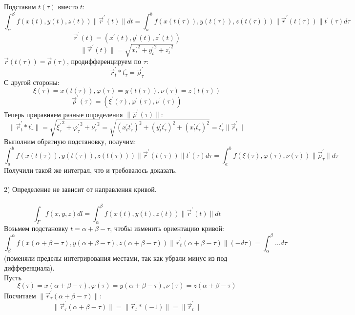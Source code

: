 \documentclass[12pt]{article}
\begin{document}
Подставим $t(\tau)$ вместо $t$:\\
$$\int_\alpha^\beta f(x(t), y(t), z(t)) \| \overrightarrow{r}^{'}(t)\|dt = \int_a^b f(x(t(\tau)), y(t(\tau)), z(t(\tau))) \| \overrightarrow{r}^{'}(t(\tau))\|t^{'}(\tau)d\tau$$
$$\overrightarrow{r}^{'}(t)=(x^{'}(t),y^{'}(t),z^{'}(t))$$
$$\|\overrightarrow{r}^{'}(t)\| = \sqrt{{x^{'}_t}^2+{y^{'}_t}^2+{z^{'}_t}^2}$$
$\overrightarrow{r}(t(\tau))=\overrightarrow{\rho}(\tau)$, продифференцируем по $\tau$:\\
$$\overrightarrow{r}^{'}_t * t^{'}_\tau = \overrightarrow{\rho}^{'}_\tau$$
С другой стороны:\\
$$\xi(\tau) = x(t(\tau)), \varphi(\tau) = y(t(\tau)), \nu(\tau) = z(t(\tau))$$
$$\overrightarrow{\rho}^{'}(\tau)=(\xi^{'}(\tau),\varphi^{'}(\tau),\nu^{'}(\tau))$$
Теперь приравняем разные определения $\|\overrightarrow{\rho}^{'}(\tau) \|$:\\
$$\| \overrightarrow{r}^{'}_t * t^{'}_\tau\| = \sqrt{{\xi^{'}_\tau}^2+{\varphi^{'}_\tau}^2+{\nu^{'}_\tau}^2} = \sqrt{({x^{'}_t t^{'}_\tau})^2+({y^{'}_t t^{'}_\tau})^2+(x^{'}_t t^{'}_\tau)^2} = t^{'}_\tau \|\overrightarrow{r}^{'}_t \|$$
Выполним обратную подстановку, получим:\\
$$\int_a^b f(x(t(\tau)), y(t(\tau)), z(t(\tau))) \| \overrightarrow{r}^{'}(t(\tau))\|t^{'}(\tau)d\tau = \int_a^b f(\xi(\tau), \varphi(\tau), \nu(\tau)) \| \overrightarrow{\rho}^{'}_\tau \|d\tau$$
Получили такой же интеграл, что и требовалось доказать.\\
\\
2) Определение не зависит от направления кривой.\\
\\
$$\int_\Gamma f(x,y,z) dl = \int_\alpha^\beta f(x(t),y(t),z(t))\|\overrightarrow{r}^{'}(t) \|dt$$
Возьмем подстановку $t=\alpha + \beta - \tau$, чтобы изменить ориентацию кривой:\\
$$\int_\beta^\alpha f(x(\alpha + \beta - \tau),y(\alpha + \beta - \tau),z(\alpha + \beta - \tau))\|\overrightarrow{r}^{'}_t (\alpha + \beta - \tau)\| (-d\tau) = \int_\alpha^\beta \dots d\tau$$
(поменяли пределы интегрирования местами, так как убрали минус из под дифференциала).\\
Пусть\\
$$\xi(\tau) = x(\alpha + \beta - \tau), \varphi(\tau) = y(\alpha + \beta - \tau), \nu(\tau) = z(\alpha + \beta - \tau)$$
Посчитаем $\|\overrightarrow{r}^{'}_\tau(\alpha + \beta - \tau) \|$:\\
$$\|\overrightarrow{r}^{'}_\tau(\alpha + \beta - \tau) \| = \|\overrightarrow{r}^{'}_t * (-1) \| = \|\overrightarrow{r}^{'}_t \|$$
\end{document}
